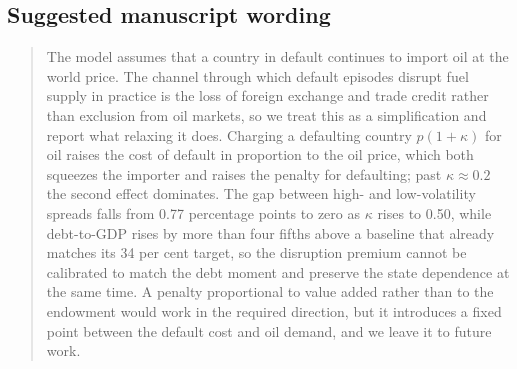 \subsection*{Suggested manuscript wording}

\begin{quote}
The model assumes that a country in default continues to import oil at the world
price. The channel through which default episodes disrupt fuel supply in
practice is the loss of foreign exchange and trade credit rather than exclusion
from oil markets, so we treat this as a simplification and report what relaxing
it does. Charging a defaulting country $p(1+\kappa)$ for oil raises the cost of
default in proportion to the oil price, which both squeezes the importer and
raises the penalty for defaulting; past $\kappa \approx 0.2$ the second effect
dominates. The gap between high- and low-volatility spreads falls from 0.77
percentage points to zero as $\kappa$ rises to 0.50, while debt-to-GDP rises by
more than four fifths above a baseline that already matches its 34 per cent
target, so the disruption premium cannot be calibrated to match the debt moment
and preserve the state dependence at the same time. A penalty proportional to
value added rather than to the endowment would work in the required direction,
but it introduces a fixed point between the default cost and oil demand, and we
leave it to future work.
\end{quote}
